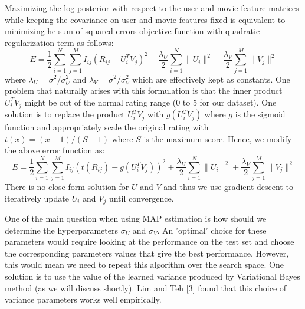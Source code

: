 \documentclass[journal,onecolumn]{IEEEtran}
\begin{document}
Maximizing the log posterior with respect to the user and movie feature matrices while keeping the covariance on user and movie features fixed is equivalent to minimizing he sum-of-squared errors objective function with quadratic regularization term as follows:
\begin{equation*}
	E  = \frac{1}{2}\overset{N}{\underset{i=1}{\sum}}\overset{M}{\underset{j=1}{\sum}}I_{ij}(R_{ij}-U_i^TV_j)^2 + \frac{\lambda_U}{2}\overset{N}{\underset{i=1}{\sum}}\rVert U_i \rVert^2 + \frac{\lambda_V}{2}\overset{M}{\underset{j=1}{\sum}}\rVert V_j \rVert^2
\end{equation*}
where $ \lambda_U = \sigma^2/\sigma_U^2 $ and $ \lambda_V = \sigma^2/\sigma_V^2 $ which are effectively kept as constants. One problem that naturally arises with this formulation is that the inner product $ U_i^TV_j $ might be out of the normal rating range (0 to 5 for our dataset). One solution is to replace the product $ U_i^TV_j $ with $ g(U_i^TV_j) $ where $ g $ is the sigmoid function and appropriately scale the original rating with $ t(x) = (x-1)/(S-1) $ where $ S $ is the maximum score. Hence, we modify the above error function as:
\begin{equation}
E  = \frac{1}{2}\overset{N}{\underset{i=1}{\sum}}\overset{M}{\underset{j=1}{\sum}}I_{ij}(t(R_{ij})-g(U_i^TV_j))^2 + \frac{\lambda_U}{2}\overset{N}{\underset{i=1}{\sum}}\rVert U_i \rVert^2 + \frac{\lambda_V}{2}\overset{M}{\underset{j=1}{\sum}}\rVert V_j \rVert^2
\end{equation}
There is no close form solution for $ U $ and $ V $ and thus we use gradient descent to iteratively update $ U_i $ and $ V_j $ until convergence.

One of the main question when using MAP estimation is how should we determine the hyperparameters $ \sigma_U $ and $ \sigma_V $. An 'optimal' choice for these parameters would require looking at the performance on the test set and choose the corresponding parameters values that give the best performance. However, this would mean we need to repeat this algorithm over the search space. One solution is to use the value of the learned variance produced by Variational Bayes method (as we will discuss shortly). Lim and Teh [3] found that this choice of variance parameters works well empirically.
\end{document}

